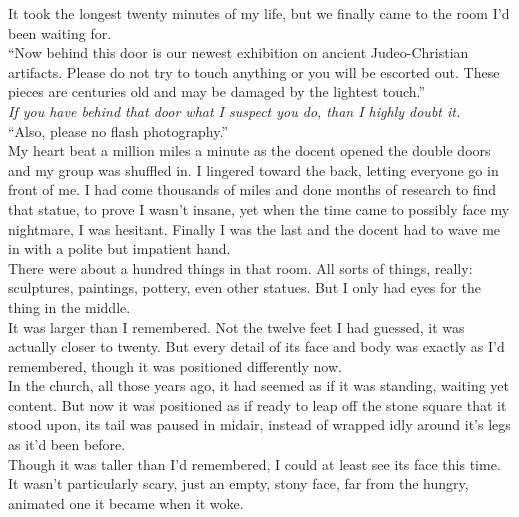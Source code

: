 \documentclass[a5paper]{scrartcl}
\begin{document}
It took the longest twenty minutes of my life, but we finally came to the room I'd been waiting for.\\


\enquote{Now behind this door is our newest exhibition on ancient Judeo-Christian artifacts. Please do not try to touch anything or you will be escorted out. These pieces are centuries old and may be damaged by the lightest touch.}\\


\textit{If you have behind that door what I suspect you do, than I 
highly doubt it.}
\\


\enquote{Also, please no flash photography.}\\


My heart beat a million miles a minute as the docent opened the double doors and my group was shuffled in. I lingered toward the back, letting everyone go in front of me.
I had come thousands of miles and done months of research to find that statue, to prove I wasn't insane, yet when the time came to possibly face my nightmare, I was hesitant.
Finally I was the last and the docent had to wave me in with a polite but impatient hand.\\


There were about a hundred things in that room. All sorts of things, really: sculptures, paintings, pottery, even other statues. But I only had eyes for the thing in the middle.\\


It was larger than I remembered. Not the twelve feet I had guessed, it was actually closer to twenty. But every detail of its face and body was exactly as I'd remembered, though it was positioned differently now.\\


In the church, all those years ago, it had seemed as if it was standing, waiting yet content. But now it was positioned as if ready to leap off the stone square that it stood upon, its tail was paused in midair, instead of wrapped idly around it's legs as it'd been before.\\


Though it was taller than I'd remembered, I could at least see its face this time. It wasn't particularly scary, just an empty, stony face, far from the hungry, animated one it became when it woke.\\

\end{document}
